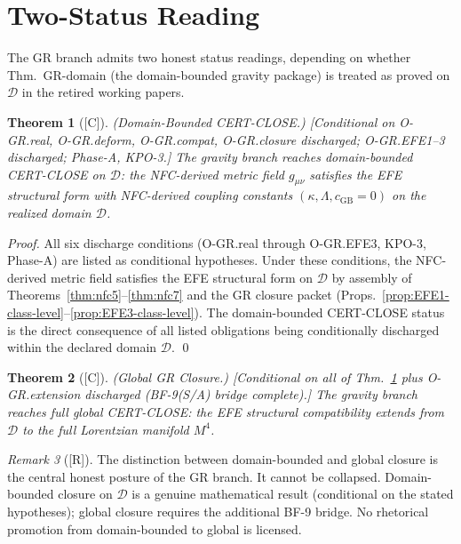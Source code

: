 \documentclass[12pt,oneside]{amsbook}
\theoremstyle{plain}
\newtheorem{theorem}{Theorem}[section]
\theoremstyle{definition}
\theoremstyle{remark}
\newtheorem{remark}[theorem]{Remark}
\newcommand{\status}[1]{\textup{[#1]}}
\begin{document}
\section{Two-Status Reading}
\label{sec:two-status}

The GR branch admits two honest status readings, depending on
whether Thm.~GR-domain (the domain-bounded gravity package) is
treated as proved on $\mathcal{D}$ in the retired working papers.

\begin{theorem}[\status{C}]\label{thm:gr-domain-bounded}
\textup{(Domain-Bounded CERT-CLOSE.)}
\textup{[Conditional on O-GR.real, O-GR.deform, O-GR.compat,
O-GR.closure discharged; O-GR.EFE1--3 discharged; Phase-A,
KPO-3.]}
The gravity branch reaches domain-bounded CERT-CLOSE on
$\mathcal{D}$: the NFC-derived metric field $g_{\mu\nu}$ satisfies
the EFE structural form with NFC-derived coupling constants
$(\kappa, \Lambda, c_{\mathrm{GB}} = 0)$ on the realized domain
$\mathcal{D}$.
\end{theorem}
\begin{proof}
All six discharge conditions (O-GR.real through O-GR.EFE3,
KPO-3, Phase-A) are listed as conditional hypotheses. Under
these conditions, the NFC-derived metric field satisfies the
EFE structural form on $\mathcal{D}$ by assembly of
Theorems~\ref{thm:nfc5}--\ref{thm:nfc7} and the GR closure
packet (Props.~\ref{prop:EFE1-class-level}--\ref{prop:EFE3-class-level}).
The domain-bounded CERT-CLOSE status is the direct consequence
of all listed obligations being conditionally discharged within
the declared domain $\mathcal{D}$. \qed
\end{proof}


\begin{theorem}[\status{C}]\label{thm:gr-global}
\textup{(Global GR Closure.)}
\textup{[Conditional on all of Thm.~\ref{thm:gr-domain-bounded}
plus O-GR.extension discharged (BF-9(S/A) bridge complete).]}
The gravity branch reaches full global CERT-CLOSE: the EFE
structural compatibility extends from $\mathcal{D}$ to the full
Lorentzian manifold $M^4$.
\end{theorem}

\begin{remark}[\status{R}]
The distinction between domain-bounded and global closure is
the central honest posture of the GR branch. It cannot be
collapsed. Domain-bounded closure on $\mathcal{D}$ is a genuine
mathematical result (conditional on the stated hypotheses); global
closure requires the additional BF-9 bridge. No rhetorical
promotion from domain-bounded to global is licensed.
\end{remark}
\end{document}
